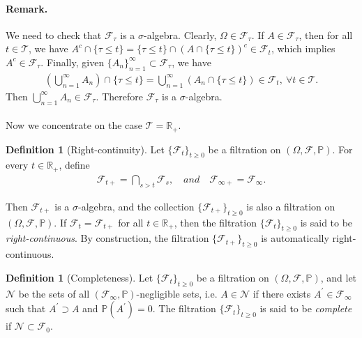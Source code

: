 \documentclass{article}
\numberwithin{equation}{section}
\renewcommand{\P}{\mathbb{P}}
\theoremstyle{plain}
\theoremstyle{definition}
\newtheorem{definition}[theorem]{Definition}
\begin{document}
\paragraph{Remark.} We need to check that $\mathscr{F}_\tau$ is a $\sigma$-algebra. Clearly, $\Omega\in\mathscr{F}_\tau$. If $A\in\mathscr{F}_\tau$, then for all $t\in\mathcal{T}$, we have $A^c\cap\{\tau\leq t\} = \{\tau\leq t\}\cap(A\cap\{\tau\leq t\})^c\in\mathscr{F}_t$, which implies $A^c\in\mathscr{F}_\tau$. Finally, given $\{A_n\}_{n=1}^\infty\subset\mathscr{F}_\tau$, we have
\begin{align*}
	\left(\bigcup_{n=1}^\infty A_n\right)\cap\{\tau\leq t\} = \bigcup_{n=1}^\infty \left(A_n\cap\{\tau\leq t\}\right)\in\mathscr{F}_t,\ \forall t\in\mathcal{T}.
\end{align*}
Then $\bigcup_{n=1}^\infty A_n\in\mathscr{F}_\tau$. Therefore $\mathscr{F}_\tau$ is a $\sigma$-algebra.

\paragraph{} Now we concentrate on the case $\mathcal{T}=\mathbb{R}_+$.

\begin{definition}[Right-continuity]\label{def:3.6}
Let $\{\mathscr{F}_t\}_{t\geq 0}$ be a filtration on $(\Omega,\mathscr{F},\P)$. For every $t\in\mathbb{R}_+$, define
\begin{align*}
	\mathscr{F}_{t+}=\bigcap_{s>t}\mathscr{F}_s,\quad\textit{and}\quad\mathscr{F}_{\infty+}=\mathscr{F}_\infty.
\end{align*}

Then $\mathscr{F}_{t+}$ is a $\sigma$-algebra, and the collection $\{\mathscr{F}_{t+}\}_{t\geq 0}$ is also a filtration on $(\Omega,\mathscr{F},\P)$. If $\mathscr{F}_t=\mathscr{F}_{t+}$ for all $t\in\mathbb{R}_+$, then the filtration $\{\mathscr{F}_t\}_{t\geq 0}$ is said to be \textit{right-continuous}. By construction, the filtration $\{\mathscr{F}_{t+}\}_{t\geq 0}$ is automatically right-continuous.
\end{definition}

\begin{definition}[Completeness]\label{def:3.7} Let $\{\mathscr{F}_t\}_{t\geq 0}$ be a filtration on $(\Omega,\mathscr{F},\P)$, and let $\mathscr{N}$ be the sets of all $(\mathscr{F}_\infty,\P)$-negligible sets, i.e. $A\in\mathscr{N}$ if there exists $A^\prime\in\mathscr{F}_\infty$ such that $A^\prime\supset A$ and $\P(A^\prime)=0$. The filtration $\{\mathscr{F}_t\}_{t\geq 0}$ is said to be \textit{complete} if $\mathscr{N}\subset\mathscr{F}_0$. 
\end{definition}
\end{document}
